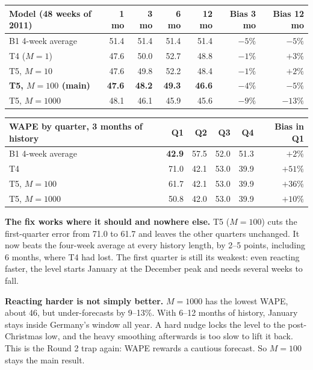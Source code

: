 \documentclass[11pt]{article}
\newcommand{\best}[1]{\textbf{#1}}
\begin{document}
\begin{center}
\begin{tabular}{l r r r r r r}
\toprule
Model (48 weeks of 2011) & 1 mo & 3 mo & 6 mo & 12 mo & Bias 3 mo & Bias 12 mo \\
\midrule
B1 4-week average & 51.4 & 51.4 & 51.4 & 51.4 & $-5\%$ & $-5\%$ \\
T4 ($M = 1$) & 47.6 & 50.0 & 52.7 & 48.8 & $-1\%$ & $+3\%$ \\
T5, $M = 10$ & 47.6 & 49.8 & 52.2 & 48.4 & $-1\%$ & $+2\%$ \\
\best{T5, $M = 100$ (main)} & \best{47.6} & \best{48.2} & \best{49.3} & \best{46.6} & $-4\%$ & $-5\%$ \\
T5, $M = 1000$ & 48.1 & 46.1 & 45.9 & 45.6 & $-9\%$ & $-13\%$ \\
\bottomrule
\end{tabular}
\end{center}

\begin{center}
\begin{tabular}{l r r r r r}
\toprule
WAPE by quarter, 3 months of history & Q1 & Q2 & Q3 & Q4 & Bias in Q1 \\
\midrule
B1 4-week average & \best{42.9} & 57.5 & 52.0 & 51.3 & $+2\%$ \\
T4 & 71.0 & 42.1 & 53.0 & 39.9 & $+51\%$ \\
T5, $M = 100$ & 61.7 & 42.1 & 53.0 & 39.9 & $+36\%$ \\
T5, $M = 1000$ & 50.8 & 42.0 & 53.0 & 39.9 & $+10\%$ \\
\bottomrule
\end{tabular}
\end{center}

\textbf{The fix works where it should and nowhere else.} T5 ($M = 100$) cuts the first-quarter error from
71.0 to 61.7 and leaves the other quarters unchanged. It now beats the four-week average at every history
length, by 2--5 points, including 6 months, where T4 had lost. The first quarter is still its weakest:
even reacting faster, the level starts January at the December peak and needs several weeks to fall.

\textbf{Reacting harder is not simply better.} $M = 1000$ has the lowest WAPE, about 46, but under-forecasts
by 9--13\%. With 6--12 months of history, January stays inside Germany's window all year. A hard nudge
locks the level to the post-Christmas low, and the heavy smoothing afterwards is too slow to lift it back.
This is the Round 2 trap again: WAPE rewards a cautious forecast. So $M = 100$ stays the main result.
\end{document}
